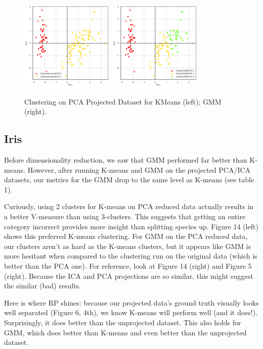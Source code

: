 \documentclass[letter]{article}
\begin{document}
\begin{figure}
  \centering
  \includegraphics[width=0.4\textwidth]{images/curiousKmeansPCA.png}
  \includegraphics[width=0.4\textwidth]{images/curiousGMMPCA.png}
  \caption{Clustering on PCA Projected Dataset for KMeans (left); GMM (right).}
\end{figure}

\subsection{Iris}
Before dimensionality reduction, we saw that GMM performed far better than K-means. However, after running K-means and GMM on the projected PCA/ICA datasets, our metrics for the GMM drop to the same level as K-means (see table 1). 

Curiously, using 2 clusters for K-means on PCA reduced data actually results in a better V-measure than using 3-clusters. This suggests that getting an entire category incorrect provides more insight than splitting species up. Figure 14 (left) shows this preferred K-means clustering. For GMM on the PCA reduced data, our clusters aren't as hard as the K-means clusters, but it appears like GMM is more hesitant when compared to the clustering run on the original data (which is better than the PCA one). For reference, look at Figure 14 (right) and Figure 5 (right). Because the ICA and PCA projections are so similar, this might suggest the similar (bad) results.

Here is where RP shines: because our projected data's ground truth visually looks well separated (Figure 6, 4th), we know K-means will perform well (and it does!). Surprisingly, it does better than the unprojected dataset. This also holds for GMM, which does better than K-means and even better than the unprojected dataset.
\end{document}
